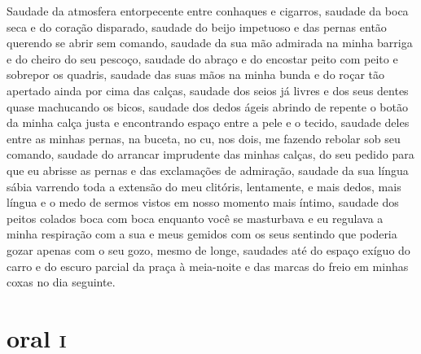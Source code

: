 Saudade da atmosfera entorpecente entre conhaques e cigarros, saudade da
boca seca e do coração disparado, saudade do beijo impetuoso e das
pernas então querendo se abrir sem comando, saudade da sua mão admirada
na minha barriga e do cheiro do seu pescoço, saudade do abraço e do
encostar peito com peito e sobrepor os quadris, saudade das suas mãos na
minha bunda e do roçar tão apertado ainda por cima das calças, saudade
dos seios já livres e dos seus dentes quase machucando os bicos, saudade
dos dedos ágeis abrindo de repente o botão da minha calça justa e
encontrando espaço entre a pele e o tecido, saudade deles entre as
minhas pernas, na buceta, no cu, nos dois, me fazendo rebolar sob seu
comando, saudade do arrancar imprudente das minhas calças, do seu pedido
para que eu abrisse as pernas e das exclamações de admiração, saudade da
sua língua sábia varrendo toda a extensão do meu clitóris, lentamente, e
mais dedos, mais língua e o medo de sermos vistos em nosso momento mais
íntimo, saudade dos peitos colados boca com boca enquanto você se
masturbava e eu regulava a minha respiração com a sua e meus gemidos com
os seus sentindo que poderia gozar apenas com o seu gozo, mesmo de
longe, saudades até do espaço exíguo do carro e do escuro parcial da
praça à meia-noite e das marcas do freio em minhas coxas no dia
seguinte.

\chapter{ oral \textsc{i} }

